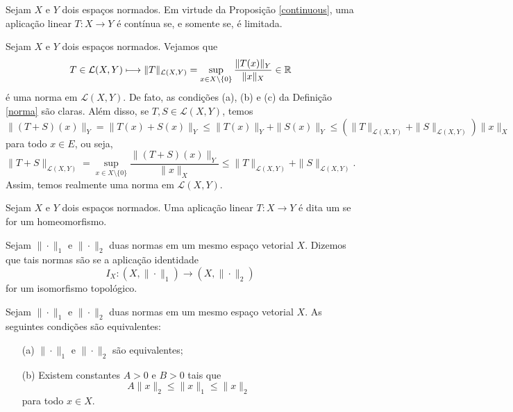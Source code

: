 \begin{remark}
Sejam $X$ e $Y$ dois espaços normados. Em virtude da Proposição 
\ref{continuous}, uma aplicação linear $T:X\longrightarrow Y$ é contínua 
se, e somente se, é limitada. 
\end{remark}

\begin{example}
Sejam $X$ e $Y$ dois espaços normados. Vejamos que 
\[
T\in \mathcal L (X,Y) \longmapsto \|T\|_{\mathcal L (X,Y)} = \sup_{x\in X\setminus \{0\}} \frac{\|T(x)\|_Y}{\|x\|_X} \in \mathbb{R}
\]
é uma norma em $\mathcal L (X,Y)$. De fato, as condições (a), (b) e (c) da Definição \ref{norma} são claras. Além disso, se $T,S\in \mathcal L (X,Y)$, temos
\begin{equation*}
\displaystyle \|(T+S)(x)\|_Y=\|T(x)+S(x)\|_Y \leq \|T(x)\|_Y +\|S(x)\|_Y \leq (\|T\|_{\mathcal L (X,Y)} + \|S\|_{\mathcal L (X,Y)})\|x\|_X
\end{equation*}
para todo $x\in E$, ou seja,
\begin{equation*}
    \displaystyle \|T+S\|_{\mathcal L (X,Y)}=\sup_{x\in X\setminus \{0\}} \frac{\|(T+S)(x)\|_Y}{\|x\|_X} \leq \|T\|_{\mathcal L (X,Y)}+\|S\|_{\mathcal L (X,Y)}.
\end{equation*}
Assim, temos realmente uma norma em $\mathcal L (X,Y)$.
\end{example}

\begin{definition}
Sejam $X$ e $Y$ dois espaços normados. Uma aplicação linear $T:X\longrightarrow Y$ é dita um   se for um homeomorfismo. 
\end{definition}

\begin{definition}
Sejam $\|\cdot\|_1$ e $\|\cdot\|_2$ duas normas em um mesmo espaço vetorial $X$. Dizemos que tais normas são   se a aplicação identidade
\[
\displaystyle I_X : (X,\|\cdot\|_1) \longrightarrow (X,\|\cdot\|_2)
\]
for um isomorfismo topológico.
\end{definition}

\begin{corollary}
Sejam $\|\cdot\|_1$ e $\|\cdot\|_2$ duas normas em um mesmo espaço vetorial $X$. As seguintes condições são equivalentes:
\begin{itemize}
\item[(a)] $\|\cdot\|_1$ e $\|\cdot\|_2$ são equivalentes;
\item[(b)] Existem constantes $A>0$ e $B>0$ tais que
\[
A\|x\|_2 \leq \|x\|_1 \leq \|x\|_2
\]
para todo $x\in X$.
\end{itemize}
\end{corollary}

